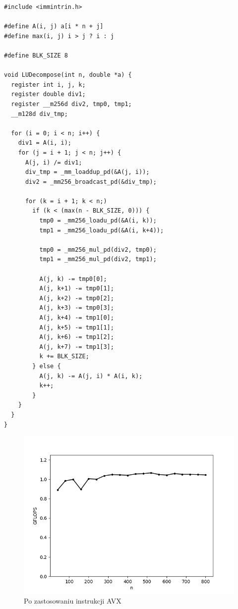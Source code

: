 \documentclass{article}
\begin{document}
\begin{verbatim}
#include <immintrin.h>

#define A(i, j) a[i * n + j]
#define max(i, j) i > j ? i : j

#define BLK_SIZE 8

void LUDecompose(int n, double *a) {
  register int i, j, k; 
  register double div1;
  register __m256d div2, tmp0, tmp1;
  __m128d div_tmp;

  for (i = 0; i < n; i++) {
    div1 = A(i, i);
    for (j = i + 1; j < n; j++) {
      A(j, i) /= div1;
      div_tmp = _mm_loaddup_pd(&A(j, i));
      div2 = _mm256_broadcast_pd(&div_tmp);

      for (k = i + 1; k < n;)
        if (k < (max(n - BLK_SIZE, 0))) {
          tmp0 = _mm256_loadu_pd(&A(i, k));
          tmp1 = _mm256_loadu_pd(&A(i, k+4));

          tmp0 = _mm256_mul_pd(div2, tmp0);
          tmp1 = _mm256_mul_pd(div2, tmp1);

          A(j, k) -= tmp0[0];
          A(j, k+1) -= tmp0[1];
          A(j, k+2) -= tmp0[2];
          A(j, k+3) -= tmp0[3];
          A(j, k+4) -= tmp1[0];
          A(j, k+5) -= tmp1[1];
          A(j, k+6) -= tmp1[2];
          A(j, k+7) -= tmp1[3];
          k += BLK_SIZE;
        } else {
          A(j, k) -= A(j, i) * A(i, k);
          k++;
        }
    }
  }
}
\end{verbatim}

\begin{figure}[H]
    \centering
    \includegraphics[width=1.0\textwidth]{figures/fig4.png}
    \caption{Po zastosowaniu instrukcji AVX}
\end{figure}
\end{document}
